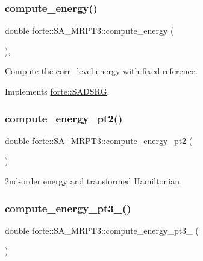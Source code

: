 \subsubsection{\texorpdfstring{compute\+\_\+energy()}{compute\_energy()}}
{\footnotesize\ttfamily double forte\+::\+S\+A\+\_\+\+M\+R\+P\+T3\+::compute\+\_\+energy (\begin{DoxyParamCaption}{ }\end{DoxyParamCaption})\hspace{0.3cm}{\ttfamily [override]}, {\ttfamily [virtual]}}



Compute the corr\+\_\+level energy with fixed reference. 



Implements \mbox{\hyperlink{classforte_1_1_s_a_d_s_r_g_aa3716848c396b296b99fff8d48751fd8}{forte\+::\+S\+A\+D\+S\+RG}}.

\mbox{\label{classforte_1_1_s_a___m_r_p_t3_a485c6d4cc01e936df4ac3e5add94b114}} 
\subsubsection{\texorpdfstring{compute\+\_\+energy\+\_\+pt2()}{compute\_energy\_pt2()}}
{\footnotesize\ttfamily double forte\+::\+S\+A\+\_\+\+M\+R\+P\+T3\+::compute\+\_\+energy\+\_\+pt2 (\begin{DoxyParamCaption}{ }\end{DoxyParamCaption})\hspace{0.3cm}{\ttfamily [protected]}}



2nd-\/order energy and transformed Hamiltonian 

\mbox{\label{classforte_1_1_s_a___m_r_p_t3_a8310e3c51a5ba44eeca27ef2cd3b8c82}} 
\subsubsection{\texorpdfstring{compute\+\_\+energy\+\_\+pt3\+\_()}{compute\_energy\_pt3\_1()}}
{\footnotesize\ttfamily double forte\+::\+S\+A\+\_\+\+M\+R\+P\+T3\+::compute\+\_\+energy\+\_\+pt3\+\_ (\begin{DoxyParamCaption}{ }\end{DoxyParamCaption})\hspace{0.3cm}{\ttfamily [protected]}}



